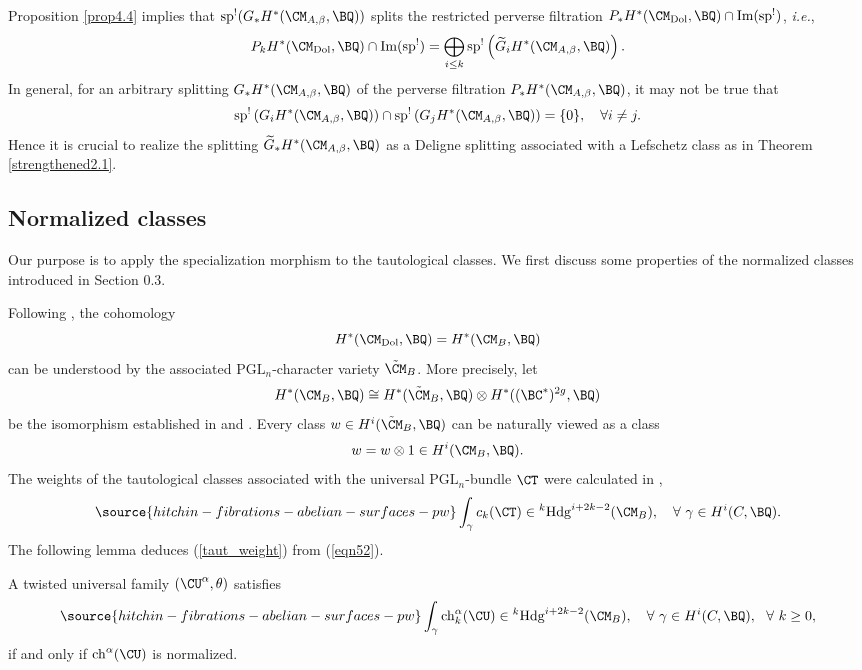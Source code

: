 \begin{rmk}
\notready\label{remark1}
Proposition \ref{prop4.4} implies that $\mathrm{sp}^!(G_*H^*(\CM_{A,\beta}, \BQ))$ splits the restricted perverse filtration $P_*H^*(\CM_{\mathrm{Dol}}, \BQ) \cap \mathrm{Im(sp^!)}$, \emph{i.e.},
\[
P_kH^*(\CM_{\mathrm{Dol}}, \BQ) \cap \mathrm{Im(sp^!)} = \bigoplus_{i\leq k} \mathrm{sp}^!\left( \widetilde{G}_iH^*(\CM_{A,\beta}, \BQ)\right).
\]
In general, for an arbitrary splitting $G_*H^*(\CM_{A,\beta}, \BQ)$ of the perverse filtration $P_*H^*(\CM_{A,\beta}, \BQ)$, it may not be true that
\[
\mathrm{sp}^!\left({G}_iH^*(\CM_{A,\beta}, \BQ) \right) \cap \mathrm{sp}^!\left({G}_jH^*(\CM_{A,\beta}, \BQ) \right) = \{0\}, \quad \forall i\neq j.
\]
Hence it is crucial to realize the splitting $\widetilde{G}_*H^*(\CM_{A,\beta}, \BQ)$ as a Deligne splitting associated with a Lefschetz class as in Theorem \ref{strengthened2.1}.
\end{rmk}



\subsection{Normalized classes} Our purpose is to apply the specialization morphism to the tautological classes. We first discuss some properties of the normalized classes introduced in Section 0.3.

Following \cite{HRV,HT1,Shende}, the cohomology
\[
H^*(\CM_{\mathrm{Dol}}, \BQ) = H^*(\CM_B, \BQ)
\]
can be understood by the associated $\mathrm{PGL}_n$-character variety $\tilde{\CM}_B$. More precisely, let
\[
H^*(\CM_B, \BQ) \cong H^*(\tilde{\CM}_B, \BQ) \otimes H^*((\BC^*)^{2g}, \BQ)
\]
be the isomorphism established in \cite[Section 1]{HT1} and \cite[Theorem 2.2.12]{HRV}. Every class $w \in H^i(\tilde{\CM}_B, \BQ)$ can be naturally viewed as a class
\[
w = w\otimes 1 \in H^i(\CM_B, \BQ).
\]
The weights of the tautological classes associated with the universal $\mathrm{PGL}_n$-bundle $\CT$ were calculated in \cite{Shende},
\begin{equation}\label{eqn52}
\source{hitchin-fibrations-abelian-surfaces-pw}
\int_\gamma c_k(\CT) \in {^k\mathrm{Hdg}^{i+2k-2}(\CM_B)},\quad \forall~\gamma \in H^i(C, \BQ).
\end{equation}
The following lemma deduces (\ref{taut_weight}) from (\ref{eqn52}).

\begin{lem}
\notready\label{lem3.1}
A twisted universal family $(\CU^\alpha, \theta)$ satisfies
\begin{equation}\label{53}
\source{hitchin-fibrations-abelian-surfaces-pw}
\int_\gamma \mathrm{ch}^\alpha_k(\CU) \in {^k\mathrm{Hdg}^{i+2k-2}(\CM_B)},\quad \forall~\gamma \in H^i(C, \BQ),~~ \forall~ k\geq 0,
\end{equation}
if and only if $\mathrm{ch}^\alpha(\CU)$ is normalized.
\end{lem}

